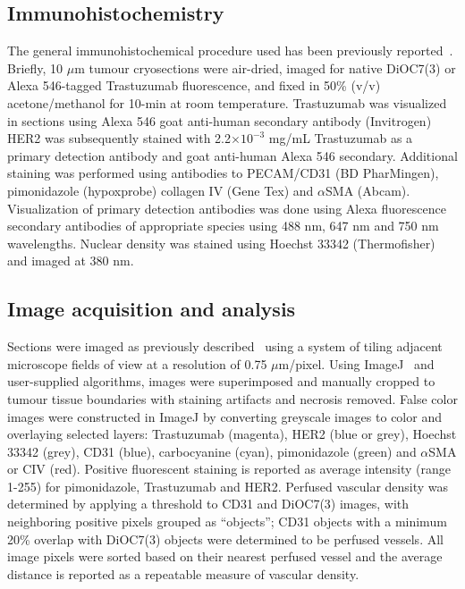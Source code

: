 \subsection{Immunohistochemistry}
The general immunohistochemical procedure used has been previously reported~\cite{Baker:2008ci}.
Briefly, 10 $\mu$m tumour cryosections were air-dried, imaged for native DiOC7(3) or Alexa 546-tagged Trastuzumab fluorescence, and fixed in 50\% (v/v) acetone/methanol for 10-min at room temperature.
Trastuzumab was visualized in sections using Alexa 546 goat anti-human secondary antibody (Invitrogen)
\acs{HER2} was subsequently stained with 2.2$\times 10^{-3}$ mg/mL Trastuzumab as a primary detection antibody and goat anti-human Alexa 546 secondary.
Additional staining was performed using antibodies to PECAM/CD31 (BD PharMingen), pimonidazole (hypoxprobe) collagen IV (Gene Tex) and $\alpha$SMA (Abcam).
Visualization of primary detection antibodies was done using Alexa fluorescence secondary antibodies of appropriate species using 488 nm, 647 nm and 750 nm wavelengths.
Nuclear density was stained using Hoechst 33342 (Thermofisher) and imaged at 380 nm.

\subsection{Image acquisition and analysis}
Sections were imaged as previously described~\cite{Kyle:2007ch} using a system of tiling adjacent microscope fields of view at a resolution of 0.75 $\mu$m/pixel.
Using ImageJ~\cite{Collins:2007jr} and user-supplied algorithms, images were superimposed and manually cropped to tumour tissue boundaries with staining artifacts and necrosis removed.
False color images were constructed in ImageJ by converting greyscale images to color and overlaying selected layers: Trastuzumab (magenta), \acs{HER2} (blue or grey), Hoechst 33342 (grey), CD31 (blue), carbocyanine (cyan), pimonidazole (green) and $\alpha$SMA or CIV (red).
Positive fluorescent staining is reported as average intensity (range 1-255) for pimonidazole, Trastuzumab and \acs{HER2}.
Perfused vascular density was determined by applying a threshold to CD31 and DiOC7(3) images, with neighboring positive pixels grouped as ``objects''; CD31 objects with a minimum 20\% overlap with DiOC7(3) objects were determined to be perfused vessels.
All image pixels were sorted based on their nearest perfused vessel and the average distance is reported as a repeatable measure of vascular density.

